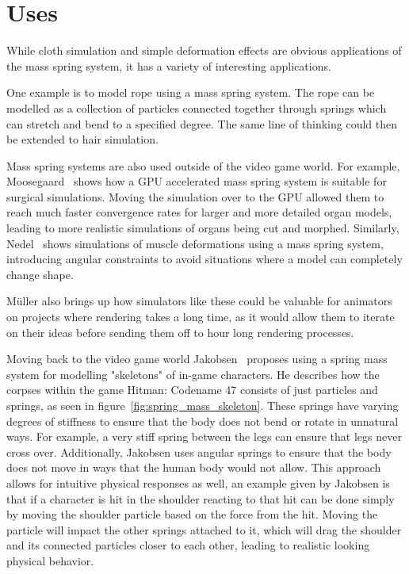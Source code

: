 \chapter{Uses}
While cloth simulation and simple deformation effects are obvious applications of the mass spring system, 
it has a variety of interesting applications.

One example is to model rope using a mass spring system. The rope can be modelled as a collection of particles
connected together through springs which can stretch and bend to a specified degree.
The same line of thinking could then be extended to hair simulation.

Mass spring systems are also used outside of the video game world.
For example, Moosegaard~\cite{mosegaards_clothing_simulation} shows how a GPU accelerated mass spring system is suitable 
for surgical simulations. Moving the simulation over to the GPU allowed them to reach much faster convergence rates for
larger and more detailed organ models, leading to more realistic simulations of organs being cut and morphed.
Similarly, Nedel~\cite{nedel_muscle_spring_mass} shows simulations of muscle deformations using a mass spring system,
introducing angular constraints to avoid situations where a model can completely change shape.

Müller\cite{muller_fem} also brings up how simulators like these could be valuable for animators on projects where
rendering takes a long time, as it would allow them to iterate on their ideas before sending them off to hour long rendering processes.

Moving back to the video game world Jakobsen~\cite{jakobsen_advanced_character_physics} proposes using a spring mass system
for modelling "skeletons" of in-game characters. 
He describes how the corpses within the game Hitman: Codename 47 consists of just particles and springs, as seen in figure~\ref{fig:spring_mass_skeleton}.
These springs have varying degrees of stiffness to ensure that the body does not bend or rotate in unnatural ways.
For example, a very stiff spring between the legs can ensure that legs never cross over.
Additionally, Jakobsen uses angular springs to ensure that the body does not move in ways that the human body would not allow.
This approach allows for intuitive physical responses as well, an example given by Jakobsen is that if a character is hit in the shoulder
reacting to that hit can be done simply by moving the shoulder particle based on the force from the hit.
Moving the particle will impact the other springs attached to it, which will drag the shoulder and its connected particles closer to each other,
leading to realistic looking physical behavior.

